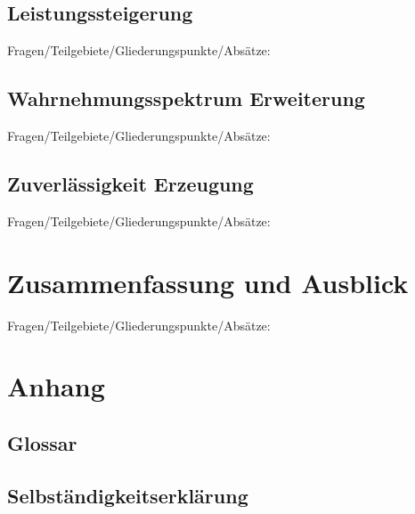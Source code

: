 \documentclass{llncs}					%
\begin{document}
\subsection{Leistungssteigerung}
Fragen/Teilgebiete/Gliederungspunkte/Absätze:

\subsection{Wahrnehmungsspektrum Erweiterung}
Fragen/Teilgebiete/Gliederungspunkte/Absätze:

\subsection{Zuverlässigkeit Erzeugung}
Fragen/Teilgebiete/Gliederungspunkte/Absätze:

\section{Zusammenfassung und Ausblick}
Fragen/Teilgebiete/Gliederungspunkte/Absätze:

\section{Anhang}

\clearpage
\subsection{Glossar}\label{glossar}

\renewcommand*{\glossarysection}[2][]{}	%
\printnoidxglossaries				%

\subsection{Selbständigkeitserklärung}

\clearpage

\end{document}
